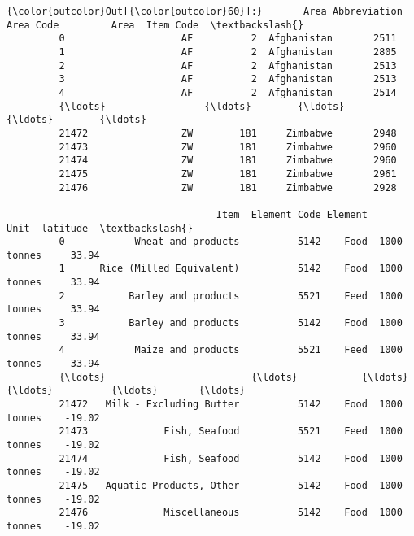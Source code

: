 \documentclass[11pt]{article}
\begin{document}
\begin{Verbatim}[commandchars=\\\{\}]
{\color{outcolor}Out[{\color{outcolor}60}]:}       Area Abbreviation  Area Code         Area  Item Code  \textbackslash{}
         0                    AF          2  Afghanistan       2511   
         1                    AF          2  Afghanistan       2805   
         2                    AF          2  Afghanistan       2513   
         3                    AF          2  Afghanistan       2513   
         4                    AF          2  Afghanistan       2514   
         {\ldots}                 {\ldots}        {\ldots}          {\ldots}        {\ldots}   
         21472                ZW        181     Zimbabwe       2948   
         21473                ZW        181     Zimbabwe       2960   
         21474                ZW        181     Zimbabwe       2960   
         21475                ZW        181     Zimbabwe       2961   
         21476                ZW        181     Zimbabwe       2928   
         
                                    Item  Element Code Element         Unit  latitude  \textbackslash{}
         0            Wheat and products          5142    Food  1000 tonnes     33.94   
         1      Rice (Milled Equivalent)          5142    Food  1000 tonnes     33.94   
         2           Barley and products          5521    Feed  1000 tonnes     33.94   
         3           Barley and products          5142    Food  1000 tonnes     33.94   
         4            Maize and products          5521    Feed  1000 tonnes     33.94   
         {\ldots}                         {\ldots}           {\ldots}     {\ldots}          {\ldots}       {\ldots}   
         21472   Milk - Excluding Butter          5142    Food  1000 tonnes    -19.02   
         21473             Fish, Seafood          5521    Feed  1000 tonnes    -19.02   
         21474             Fish, Seafood          5142    Food  1000 tonnes    -19.02   
         21475   Aquatic Products, Other          5142    Food  1000 tonnes    -19.02   
         21476             Miscellaneous          5142    Food  1000 tonnes    -19.02   
         

\end{Verbatim}
\end{document}
